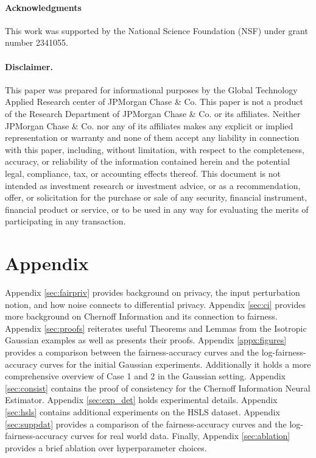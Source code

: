 \documentclass[11pt,letterpaper]{article}
\begin{document}
\paragraph{Acknowledgments} This work was supported by the National Science Foundation (NSF) under grant number 2341055.

\paragraph{Disclaimer.}
This paper was prepared for informational purposes by the Global Technology Applied Research center of JPMorgan Chase \& Co. This paper is not a product of the Research Department of JPMorgan Chase \& Co. or its
affiliates. Neither JPMorgan Chase \& Co. nor any of its affiliates makes any explicit or implied representation
or warranty and none of them accept any liability in connection with this paper, including, without limitation,
with respect to the completeness, accuracy, or reliability of the information contained herein and the potential
legal, compliance, tax, or accounting effects thereof. This document is not intended as investment research
or investment advice, or as a recommendation, offer, or solicitation for the purchase or sale of any security,
financial instrument, financial product or service, or to be used in any way for evaluating the merits of participating in any transaction.





\clearpage
\appendix

\onecolumn

\section*{Appendix}

Appendix \ref{sec:fairpriv} provides background on privacy, the input perturbation notion, and how noise connects to differential privacy. Appendix \ref{sec:ci} provides more background on Chernoff Information and its connection to fairness. Appendix \ref{sec:proofs} reiterates useful Theorems and Lemmas from the Isotropic Gaussian examples as well as presents their proofs. Appendix \ref{appx:figures} provides a comparison between the fairness-accuracy curves and the log-fairness-accuracy curves for the initial Gaussian experiments. Additionally it holds a more comprehensive overview of Case 1 and 2 in the Gaussian setting. Appendix \ref{sec:consist} contains the proof of consistency for the Chernoff Information Neural Estimator. Appendix \ref{sec:exp_det} holds experimental details. Appendix \ref{sec:hsls} contains additional experiments on the HSLS dataset. Appendix \ref{sec:suppdat} provides a comparison of the fairness-accuracy curves and the log-fairness-accuracy curves for real world data. Finally, Appendix \ref{sec:ablation} provides a brief ablation over hyperparameter choices.
\end{document}
